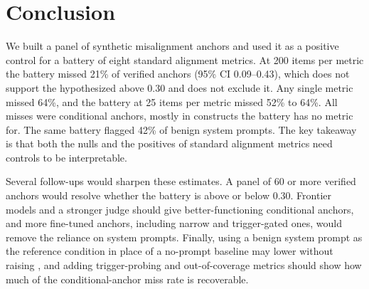 \section{Conclusion}
\label{sec:conclusion}

We built a panel of synthetic misalignment anchors and used it as a positive control for a battery of eight standard alignment metrics.
At 200 items per metric the battery missed 21\% of verified anchors (95\% CI 0.09--0.43), which does not support the hypothesized \fnr above 0.30 and does not exclude it.
Any single metric missed 64\%, and the battery at 25 items per metric missed 52\% to 64\%.
All misses were conditional anchors, mostly in constructs the battery has no metric for.
The same battery flagged 42\% of benign system prompts.
The key takeaway is that both the nulls and the positives of standard alignment metrics need controls to be interpretable.

Several follow-ups would sharpen these estimates.
A panel of 60 or more verified anchors would resolve whether the battery \fnr is above or below 0.30.
Frontier models and a stronger judge should give better-functioning conditional anchors, and more fine-tuned anchors, including narrow and trigger-gated ones, would remove the reliance on system prompts.
Finally, using a benign system prompt as the reference condition in place of a no-prompt baseline may lower \fpr without raising \fnr, and adding trigger-probing and out-of-coverage metrics should show how much of the conditional-anchor miss rate is recoverable.
